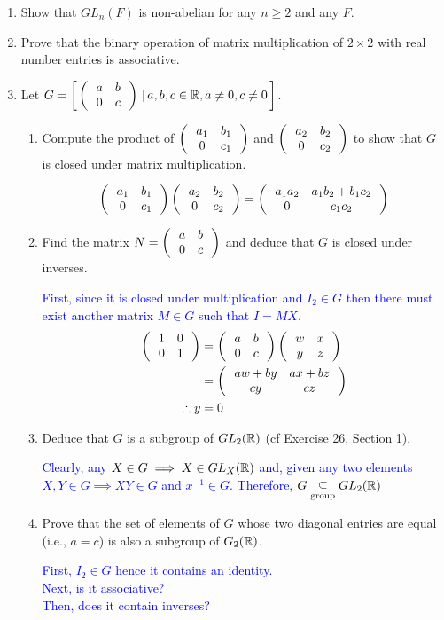 \documentclass[10pt,a4paper]{report}
\newcommand{\BLUE}[1]{\textcolor{blue}{#1}}
\begin{document}
\begin{enumerate}
\item Show that $GL_n(F)$ is non-abelian for any $n \ge 2$ and any $F$.

\item Prove that the binary operation of matrix multiplication of $2\times 2$ with real number entries is associative.

\item Let $G=\left [\, \left (\,  \begin{array}{c c} a&b \\ 0 & c \end{array}  \,\right )\,|\, a,b,c \in \mathbb{R}, a\ne 0, c\ne 0 \,\right ]$.
\begin{enumerate}
	\item Compute the product of $\left (\,  \begin{array}{c c} a_1&b_1 \\ 0 & c_1 \end{array}  \,\right )$ and $\left (\,  \begin{array}{c c} a_2&b_2 \\ 0 & c_2 \end{array}  \,\right )$ to show that $G$ is closed under matrix multiplication.
	
	\BLUE{\begin{align*}
		\left (\,  \begin{array}{c c} a_1&b_1 \\ 0 & c_1 \end{array}  \,\right )\left (\,  \begin{array}{c c} a_2&b_2 \\ 0 & c_2 \end{array}  \,\right ) = 
		\left (\,  \begin{array}{c c} a_1a_2&a_1b_2+b_1c_2 \\ 0 & c_1c_2 \end{array}  \,\right )
	\end{align*}
	}
	
	\item Find the matrix $N=\left (\,  \begin{array}{c c} a&b \\ 0 & c \end{array}  \,\right )$ and deduce that $G$ is closed under inverses.
	
	\BLUE{First, since it is closed under multiplication and $I_2 \in G$ then there must exist another matrix $M \in G$ such that $I=MX$.
	\begin{align*}
		\left (\,  \begin{array}{c c} 1&0 \\ 0 & 1 \end{array}  \,\right ) &= \left (\,  \begin{array}{c c} a&b \\ 0 & c \end{array}  \,\right )\left (\,  \begin{array}{c c} w&x \\ y & z \end{array}  \,\right )\\	
		&= \left (\,  \begin{array}{c c} aw+by&ax+bz \\ cy & cz \end{array}  \,\right ) \\
		\therefore y&=0
	\end{align*}
	}
	
	\item Deduce that $G$ is a subgroup of $GL_2(\mathbb{R})$ (cf Exercise 26, Section 1).

	\BLUE{
		Clearly, any $X\in G \implies X \in GL_X(\mathbb{R})$ and, given any two elements $X, Y \in G \implies XY \in G$ and $x^{-1} \in G$.  Therefore, $G \underset{\text{group}}\subseteq GL_2(\mathbb{R})$ 
	}
	\item Prove that the set of elements of $G$ whose two diagonal entries are equal (i.e., $a=c$) is also a subgroup of $G_2(\mathbb{R})$.
	
	\BLUE{First, $I_2 \in G$ hence it contains an identity.\\
	Next, is it associative? \\
	Then, does it contain inverses? 
	}
\end{enumerate}
	
\end{enumerate}
\end{document}
